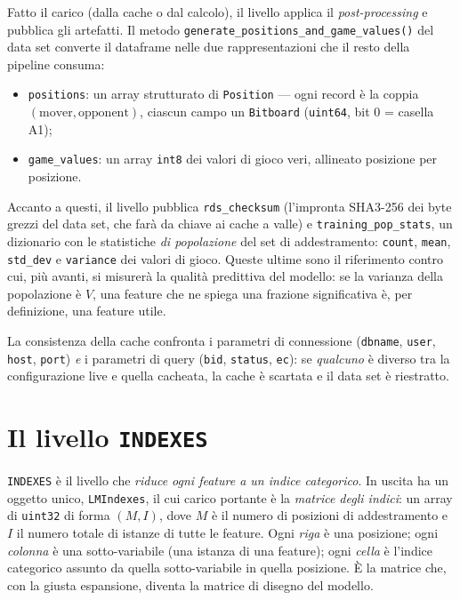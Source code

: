 Fatto il carico (dalla cache o dal calcolo), il livello applica il
\emph{post-processing} e pubblica gli artefatti. Il metodo
\texttt{generate\_positions\_and\_game\_values()} del data set converte il
dataframe nelle due rappresentazioni che il resto della pipeline consuma:

\begin{itemize}
  \item \texttt{positions}: un array strutturato di \texttt{Position} —
        ogni record è la coppia $(\text{mover}, \text{opponent})$, ciascun
        campo un \texttt{Bitboard} (\texttt{uint64}, bit 0 = casella A1);
  \item \texttt{game\_values}: un array \texttt{int8} dei valori di gioco veri,
        allineato posizione per posizione.
\end{itemize}

Accanto a questi, il livello pubblica \texttt{rds\_checksum} (l'impronta
SHA3-256 dei byte grezzi del data set, che farà da chiave ai cache a valle) e
\texttt{training\_pop\_stats}, un dizionario con le statistiche
\emph{di popolazione} del set di addestramento: \texttt{count}, \texttt{mean},
\texttt{std\_dev} e \texttt{variance} dei valori di gioco. Queste ultime sono
il riferimento contro cui, più avanti, si misurerà la qualità predittiva del
modello: se la varianza della popolazione è $V$, una feature che ne spiega una
frazione significativa è, per definizione, una feature utile.

La consistenza della cache confronta i parametri di connessione
(\texttt{dbname}, \texttt{user}, \texttt{host}, \texttt{port}) \emph{e} i
parametri di query (\texttt{bid}, \texttt{status}, \texttt{ec}): se
\emph{qualcuno} è diverso tra la configurazione live e quella cacheata, la
cache è scartata e il data set è riestratto.

\section{Il livello \texttt{INDEXES}}
\label{sec:corpus-indexes}

\texttt{INDEXES} è il livello che \emph{riduce ogni feature a un indice
categorico}. In uscita ha un oggetto unico, \texttt{LMIndexes}, il cui carico
portante è la \emph{matrice degli indici}: un array di \texttt{uint32} di
forma $(M, I)$, dove $M$ è il numero di posizioni di addestramento e $I$ il
numero totale di istanze di tutte le feature. Ogni \emph{riga} è una
posizione; ogni \emph{colonna} è una sotto-variabile (una istanza di una
feature); ogni \emph{cella} è l'indice categorico assunto da quella
sotto-variabile in quella posizione. È la matrice che, con la giusta
espansione, diventa la matrice di disegno del modello.

